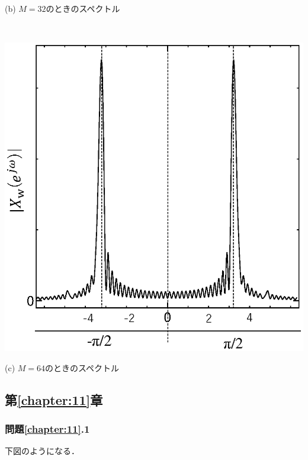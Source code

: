 \begin{center}
\begin{minipage}{.35\textwidth}
\begin{center}
(b) $M=32$のときのスペクトル
\end{center}
\end{minipage}\\[.5\baselineskip]
\begin{minipage}{.35\textwidth}
\begin{center}
\includegraphics[width=.98\textwidth]{fig/zu-5-14-c.eps}

(c)  $M=64$のときのスペクトル
\end{center}
\end{minipage}
\end{center}


\subsection*{第\ref{chapter:11}章}

\subsubsection*{問題\ref{chapter:11}.1}

下図のようになる．

